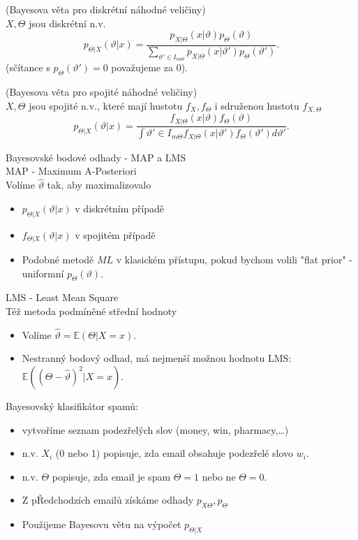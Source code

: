 \documentclass[../main.tex]{subfiles}
\begin{document}
\begin{theorem} (Bayesova věta pro diskrétní náhodné veličiny)\\
    $X,\Theta$ jsou diskrétní n.v.
    \[p_{\Theta|X} (\vartheta | x) = \frac{p_{X|\Theta}(x|\vartheta)p_\Theta(\vartheta)}{\sum_{\vartheta' \in I_{m\Theta}}p_{X|\Theta}(x|\vartheta')p_\Theta(\vartheta')}.\]
    (sčítance s $p_\Theta(\vartheta') = 0$ považujeme za 0).
\end{theorem}
\begin{theorem} (Bayesova věta pro spojité náhodné veličiny)\\
    $X,\Theta$ jsou spojité n.v., které mají hustotu $f_X, f_\Theta$ i sdruženou hustotu $f_{X,\Theta}$
    \[p_{\Theta|X} (\vartheta | x) = \frac{f_{X|\Theta}(x|\vartheta)f_\Theta(\vartheta)}{\int{\vartheta' \in I_{m\Theta}}f_{X|\Theta}(x|\vartheta')f_\Theta(\vartheta')d\vartheta'}.\]
    
\end{theorem}
Bayesovské bodové odhady - MAP a LMS\\
MAP - Maximum A-Posteriori\\
Volíme $\widehat{\vartheta}$ tak, aby maximalizovalo
\begin{itemize}
    \item $p_{\Theta|X}(\vartheta|x)$ v diskrétním případě
    \item $f_{\Theta|X}(\vartheta|x)$ v spojitém případě
    \item Podobné metodě $ML$ v klasickém přístupu, pokud bychom volili "flat prior" - uniformní $p_\Theta(\vartheta)$.
\end{itemize}
LMS - Least Mean Square\\
Též metoda podmíněné střední hodnoty
\begin{itemize}
    \item Volíme $\widehat{\vartheta} = \mathbb{E}(\Theta|X = x)$.
    \item Nestranný bodový odhad, má nejmenší možnou hodnotu LMS: $\mathbb{E}((\Theta - \widehat{\vartheta})^2 |X = x)$.
\end{itemize}
\begin{example}
    Bayesovský klasifikátor spamů:
    \begin{itemize}
        \item vytvoříme seznam podezřelých slov (money, win, pharmacy,\dots)
        \item n.v. $X_i$ (0 nebo 1) popisuje, zda email obsahuje podezřelé slovo $w_i$.
        \item n.v. $\Theta$ popisuje, zda email je spam $\Theta = 1$ nebo ne $\Theta = 0$.
        \item Z pŘedchodzích emailů získáme odhady $p_{X\Theta}, p_\Theta$
        \item Použijeme Bayesovu větu na výpočet $p_{\Theta | X}$ 
    \end{itemize}
\end{example}
\end{document}
